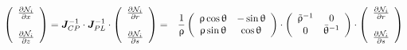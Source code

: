 \begin{eqnarray}
\left(
\begin{array}{c}
\frac{\partial {\mathcal{N}}_i}{\partial x} \\ \\
\frac{\partial {\mathcal{N}}_i}{\partial z} 
\end{array}
\right)
={\bm J}_{CP}^{-1}\cdot {\bm J}_{PL}^{-1}\cdot 
\left(
\begin{array}{c}
\frac{\partial {\mathcal{N}}_i}{\partial r} \\ \\
\frac{\partial {\mathcal{N}}_i}{\partial s} 
\end{array}
\right)  
&=&
\frac{1}{\uprho}
\left(
\begin{array}{cc}
\uprho\cos\uptheta & -\sin\uptheta \\
\uprho\sin\uptheta & \cos\uptheta
\end{array}
\right)
\cdot
\left(
\begin{array}{cc}
\tilde{\uprho}^{-1} & 0 \\
0 &  \bar{\uptheta}^{-1}
\end{array}
\right)
\cdot 
\left(
\begin{array}{c}
\frac{\partial {\mathcal{N}}_i}{\partial r} \\ \\
\frac{\partial {\mathcal{N}}_i}{\partial s} 
\end{array}
\right)  
\end{eqnarray}

